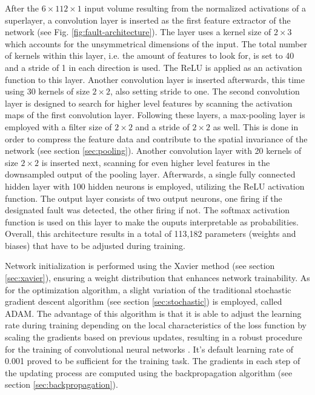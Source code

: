 After the \(6 \times 112 \times 1\) input volume resulting from the
normalized activations of a superlayer, a convolution layer
is inserted as the first feature extractor of the network (see
Fig. \ref{fig:fault-architecture}). The layer
uses a kernel size of \(2 \times 3\) which accounts for the
unsymmetrical dimensions of the input. The total number of kernels
within this layer, i.e. the amount of features to look for, is set to
40 and a stride of 1 in each direction is used. The ReLU is applied
as an activation function to this layer. Another convolution layer is
inserted afterwards, this time using 30 kernels of size \(2 \times
2\), also setting stride to one. The second convolution layer is
designed to search for higher level features by scanning the
activation maps of the first convolution layer.
Following these layers, a max-pooling layer is
employed with a filter size of \(2 \times 2\) and a stride of \(2
\times 2\) as well. This is done in order to compress the feature data
and contribute to the spatial invariance of the network (see section
\ref{sec:pooling}). Another convolution layer with 20
kernels of size \(2 \times 2\) is inserted next, scanning for even
higher level features in the downsampled output of the pooling
layer. Afterwards, a single fully
connected hidden layer with 100 hidden neurons is employed, utilizing
the ReLU activation function. The output layer consists of two
output neurons, one firing if the designated fault was detected, the
other firing if not. The softmax activation function is used on this
layer to make the ouputs interpretable as probabilities. Overall, this
architecture results in a total of 113,182 parameters (weights and
biases) that have to be adjusted during training.

Network initialization is performed using the Xavier
method (see section \ref{sec:xavier}), ensuring a weight distribution
that enhances network trainability. As for the optimization algorithm,
a slight variation of the traditional stochastic gradient
descent algorithm (see section \ref{sec:stochastic}) is employed,
called ADAM. The advantage of this algorithm is that it is able to
adjust the learning rate during training depending on the local
characteristics of the loss function by scaling the gradients based on
previous updates, resulting in a robust procedure for the training of
convolutional neural networks \cite{adam}. It's default learning rate
of 0.001 proved to be sufficient for the training task. The gradients
in each step of the updating process are computed using the
backpropagation algorithm (see section \ref{sec:backpropagation}).

